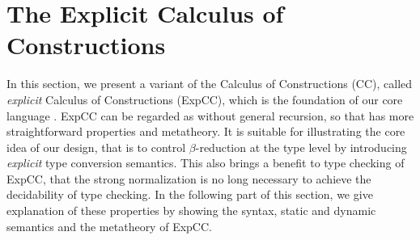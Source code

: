 \section{The Explicit Calculus of Constructions}
\label{sec:formal}




\newcommand{\expcc}{\textsf{ExpCC}\xspace}
\newcommand{\cc}{\textsf{CC}\xspace}
\newcommand{\gram}[1]{\ottgrammartabular{#1\ottafterlastrule}}
\newcommand{\ruleref}[1]{\ottdrulename{#1}}

In this section, we present a variant of the Calculus of Constructions (\cc), called \emph{explicit} Calculus of Constructions (\expcc), which is the foundation of our core language \name. \expcc can be regarded as \name without general recursion, so that has more straightforward properties and metatheory. It is suitable for illustrating the core idea of our design, that is to control $\beta$-reduction at the type level by introducing \emph{explicit} type conversion semantics. This also brings a benefit to type checking of \expcc, that the strong normalization is no long necessary to achieve the decidability of type checking. In the following part of this section, we give explanation of these properties by showing the syntax, static and dynamic semantics and the metatheory of \expcc.

